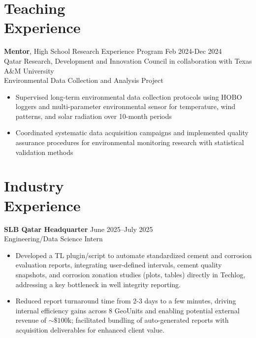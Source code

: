 \documentclass[resmargin, 10pt]{res} %
\begin{document}
\begin{resume}
\section{Teaching \\ Experience}
{\bf Mentor}, High School Research Experience Program \hfill Feb 2024-Dec 2024 \\
Qatar Research, Development and Innovation Council in collaboration with Texas A\&M University  \\
Environmental Data Collection and Analysis Project
\begin{itemize}[itemsep=0em]
\item Supervised long-term environmental data collection protocols using HOBO loggers and multi-parameter environmental sensor for temperature, wind patterns, and solar radiation over 10-month periods
\item Coordinated systematic data acquisition campaigns and implemented quality assurance procedures for environmental monitoring research with statistical validation methods
\end{itemize}

\vspace{-5pt}
\section{Industry \\ Experience}

{\bf SLB Qatar Headquarter} \hfill June 2025--July 2025 \\
Engineering/Data Science Intern
\begin{itemize}[itemsep=0em]
\item Developed a TL plugin/script to automate standardized cement and corrosion evaluation reports, integrating user-defined intervals, cement quality snapshots, and corrosion zonation studies (plots, tables) directly in Techlog, addressing a key bottleneck in well integrity reporting.
\item Reduced report turnaround time from 2-3 days to a few minutes, driving internal efficiency gains across 8 GeoUnits and enabling potential external revenue of $\sim\$100$k; facilitated bundling of auto-generated reports with acquisition deliverables for enhanced client value.
\end{itemize}


\vspace{-5pt}

\end{resume}
\end{document}
